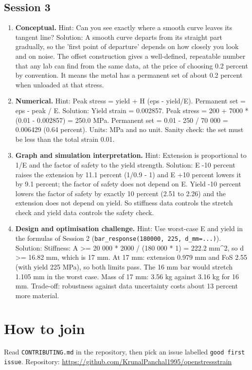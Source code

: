 \documentclass[11pt,a4paper]{article}
\begin{document}
\subsection*{Session 3}
\begin{enumerate}[nosep]
\item \textbf{Conceptual.} Hint: Can you see exactly where a smooth curve leaves its tangent line? Solution: A smooth curve departs from its straight part gradually, so the 'first point of departure' depends on how closely you look and on noise. The offset construction gives a well-defined, repeatable number that any lab can find from the same data, at the price of choosing 0.2 percent by convention. It means the metal has a permanent set of about 0.2 percent when unloaded at that stress.
\item \textbf{Numerical.} Hint: Peak stress = yield + H (eps - yield/E). Permanent set = eps - peak / E. Solution: Yield strain = 0.002857. Peak stress = 200 + 7000 * (0.01 - 0.002857) = 250.0 MPa. Permanent set = 0.01 - 250 / 70 000 = 0.006429 (0.64 percent). Units: MPa and no unit. Sanity check: the set must be less than the total strain 0.01.
\item \textbf{Graph and simulation interpretation.} Hint: Extension is proportional to 1/E and the factor of safety to the yield strength. Solution: E -10 percent raises the extension by 11.1 percent (1/0.9 - 1) and E +10 percent lowers it by 9.1 percent; the factor of safety does not depend on E. Yield -10 percent lowers the factor of safety by exactly 10 percent (2.51 to 2.26) and the extension does not depend on yield. So stiffness data controls the stretch check and yield data controls the safety check.
\item \textbf{Design and optimisation challenge.} Hint: Use worst-case E and yield in the formulas of Session 2 (\texttt{bar\_response(180000, 225, d\_mm=...)}). Solution: Stiffness: A \textgreater{}= 20 000 * 2000 / (180 000 * 1) = 222.2 mm\textasciicircum{}2, so d \textgreater{}= 16.82 mm, which is 17 mm. At 17 mm: extension 0.979 mm and FoS 2.55 (with yield 225 MPa), so both limits pass. The 16 mm bar would stretch 1.105 mm in the worst case. Mass of 17 mm: 3.56 kg against 3.16 kg for 16 mm. Trade-off: robustness against data uncertainty costs about 13 percent more material.
\end{enumerate}

\section{How to join}
Read \texttt{CONTRIBUTING.md} in the repository, then pick an issue labelled \texttt{good first issue}. Repository: \url{https://github.com/KrunalPanchal1995/openstressstrain}
\end{document}
